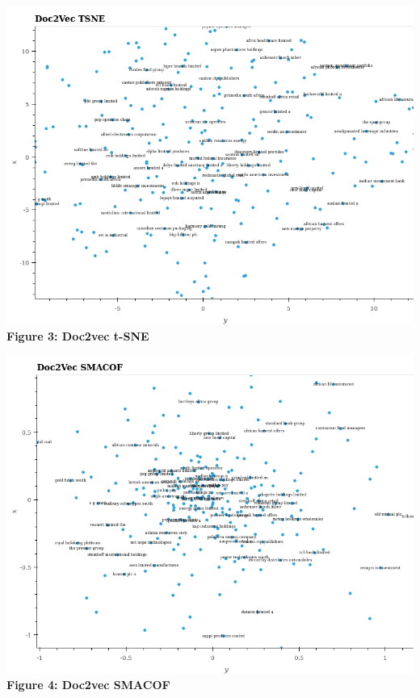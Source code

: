 \documentclass[11pt]{article}
\makeatletter
\def\maxwidth{\ifdim\Gin@nat@width>\linewidth\linewidth
    \else\Gin@nat@width\fi}
\let\Oldincludegraphics\includegraphics
\renewcommand{\includegraphics}[1]{\Oldincludegraphics[width=.8\maxwidth]{#1}}
\makeatother
\begin{document}
\includegraphics{../experiments/media/Doc2Vec TSNE.png}\\

\textbf{Figure 3: Doc2vec t-SNE}

\includegraphics{../experiments/media/Doc2Vec SMACOF.png}\\

\textbf{Figure 4: Doc2vec SMACOF}
\end{document}
